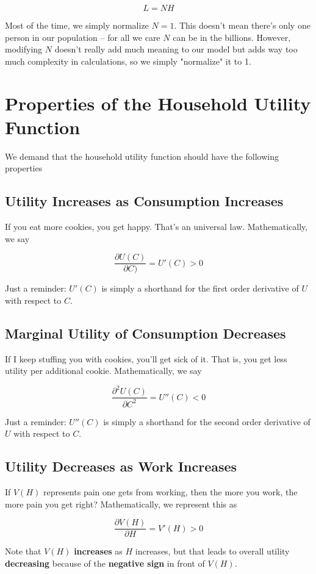 \documentclass[11pt]{scrartcl}
\begin{document}
\[L = NH\]

Most of the time, we simply normalize $N = 1$. This doesn't mean there's only one person in our population -- for all we care $N$ can be in the billions. However, modifying $N$ doesn't really add much meaning to our model but adds way too much complexity in calculations, so we simply "normalize" it to 1. 

\section{Properties of the Household Utility Function}

We demand that the household utility function should have the following properties

\subsection{Utility Increases as Consumption Increases}
If you eat more cookies, you get happy. That's an universal law. Mathematically, we say

\[ \frac{\partial U(C)}{\partial C)} = U'(C) > 0\]

Just a reminder: $U'(C)$ is simply a shorthand for the first order derivative of $U$ with respect to $C$. 

\subsection{Marginal Utility of Consumption Decreases}
If I keep stuffing you with cookies, you'll get sick of it. That is, you get less utility per additional cookie. Mathematically, we say

\[ \frac{\partial^2 U(C)}{\partial C^2} = U''(C) < 0\]

Just a reminder: $U''(C)$ is simply a shorthand for the second order derivative of $U$ with respect to $C$. 

\subsection{Utility Decreases as Work Increases}
If $V(H)$ represents pain one gets from working, then the more you work, the more pain you get right? Mathematically, we represent this as

\[ \frac{\partial V(H)}{\partial H} = V'(H) > 0\]

Note that $V(H)$ \textbf{increases} as $H$ increases, but that leads to overall utility \textbf{decreasing} because of the \textbf{negative sign} in front of $V(H)$.
\end{document}
